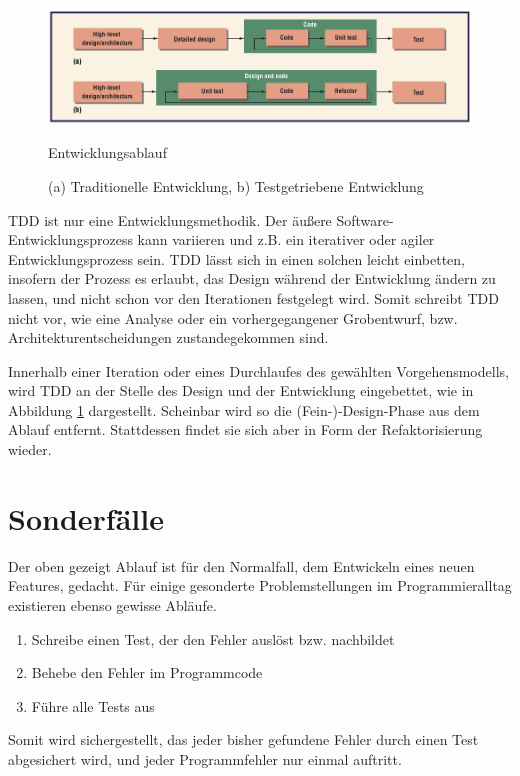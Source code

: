     \begin{figure}[hbtp]
 \centering
 \includegraphics[width=\textwidth]{./diagrams/ablauf.png}
 \caption{Entwicklungsablauf}
 \caption*{(a) Traditionelle Entwicklung,  b) Testgetriebene Entwicklung}
 \label{fig:devflow}
\end{figure}

 TDD ist nur eine Entwicklungsmethodik. Der äußere Software-Entwicklungsprozess kann variieren und z.B. ein iterativer oder agiler Entwicklungsprozess sein. TDD lässt sich in einen solchen leicht einbetten, insofern der Prozess es erlaubt, das Design während der Entwicklung ändern zu lassen, und nicht schon vor den Iterationen festgelegt wird. Somit schreibt TDD nicht vor, wie eine Analyse oder ein vorhergegangener Grobentwurf, bzw. Architekturentscheidungen zustandegekommen sind.

 Innerhalb einer Iteration oder eines Durchlaufes des gewählten Vorgehensmodells, wird TDD an der Stelle des Design und der Entwicklung eingebettet, wie in Abbildung \ref{fig:devflow} dargestellt. Scheinbar wird so die (Fein-)-Design-Phase aus dem Ablauf entfernt. Stattdessen findet sie sich aber in Form der Refaktorisierung wieder.


  \section{Sonderfälle}
  \label{sec:tddspecialcircumstances}

  Der oben gezeigt Ablauf ist für den Normalfall, dem Entwickeln eines neuen Features, gedacht. Für einige gesonderte Problemstellungen im Programmieralltag existieren ebenso gewisse Abläufe.

  \begin{enumerate}
   \item Schreibe einen Test, der den Fehler auslöst bzw. nachbildet
   \item Behebe den Fehler im Programmcode
   \item Führe alle Tests aus
  \end{enumerate}
  Somit wird sichergestellt, das jeder bisher gefundene Fehler durch einen Test abgesichert wird, und jeder Programmfehler nur einmal auftritt.

